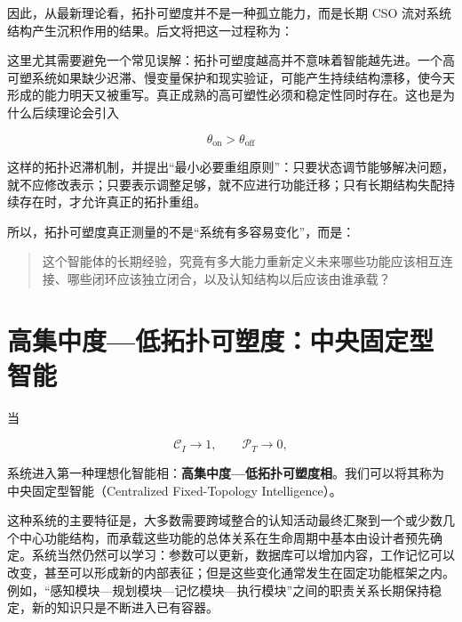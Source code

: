 因此，从最新理论看，拓扑可塑度并不是一种孤立能力，而是长期 CSO 流对系统结构产生沉积作用的结果。后文将把这一过程称为：

\begin{statementbox}
\centering
{}
\end{statementbox}

这里尤其需要避免一个常见误解：拓扑可塑度越高并不意味着智能越先进。一个高可塑系统如果缺少迟滞、慢变量保护和现实验证，可能产生持续结构漂移，使今天形成的能力明天又被重写。真正成熟的高可塑性必须和稳定性同时存在。这也是为什么后续理论会引入

\begin{equation}
\theta_{\mathrm{on}}
>
\theta_{\mathrm{off}}
\end{equation}

这样的拓扑迟滞机制，并提出“最小必要重组原则”：只要状态调节能够解决问题，就不应修改表示；只要表示调整足够，就不应进行功能迁移；只有长期结构失配持续存在时，才允许真正的拓扑重组。

所以，拓扑可塑度真正测量的不是“系统有多容易变化”，而是：

\begin{quote}
这个智能体的长期经验，究竟有多大能力重新定义未来哪些功能应该相互连接、哪些闭环应该独立闭合，以及认知结构以后应该由谁承载？
\end{quote}

\section{高集中度—低拓扑可塑度：中央固定型智能}
\label{sec:centralized_fixed_phase}

当

\begin{equation}
\mathcal{C}_{I}\rightarrow1,
\qquad
\mathcal{P}_{T}\rightarrow0,
\end{equation}

系统进入第一种理想化智能相：\textbf{高集中度—低拓扑可塑度相}。我们可以将其称为中央固定型智能（Centralized Fixed-Topology Intelligence）。

这种系统的主要特征是，大多数需要跨域整合的认知活动最终汇聚到一个或少数几个中心功能结构，而承载这些功能的总体关系在生命周期中基本由设计者预先确定。系统当然仍然可以学习：参数可以更新，数据库可以增加内容，工作记忆可以改变，甚至可以形成新的内部表征；但是这些变化通常发生在固定功能框架之内。例如，“感知模块—规划模块—记忆模块—执行模块”之间的职责关系长期保持稳定，新的知识只是不断进入已有容器。

